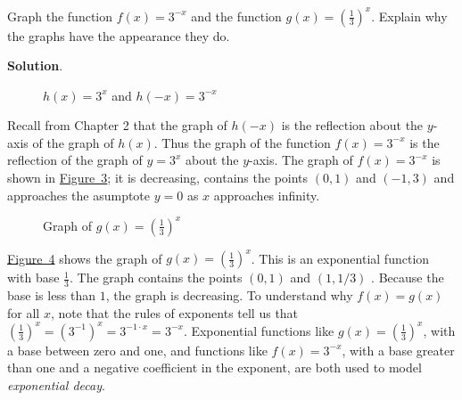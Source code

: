 \documentclass[10pt,]{book}
\theoremstyle{ptxdefinitionnotitle}
\theoremstyle{ptxdefinitiontitle}
\theoremstyle{ptxdefinitionnotitle}
\theoremstyle{ptxdefinitiontitle}
\theoremstyle{ptxdefinitionnotitle}
\theoremstyle{ptxdefinitiontitle}
\numberwithin{equation}{section}
\begin{document}
\begin{example}\label{example-14}
\hypertarget{p-235}{}%
Graph the function \(f(x)=3^{-x}\) and the function \(g(x)=(\frac{1}{3})^x\).  Explain why the graphs have the appearance they do.%
\par\smallskip%
\noindent\textbf{Solution}.\hypertarget{solution-14}{}\quad%
\hypertarget{p-236}{}%
\leavevmode%
\begin{figure}
\centering
{
}
\caption{\(h(x) = 3^x\) and \(h(-x) = 3^{-x}\)\label{figure-hreflection-of-3x}}
\end{figure}
 Recall from Chapter 2 that the graph of \(h(-x)\) is the reflection about the \(y\)-axis of the graph of \(h(x)\). Thus the graph of the function \(f(x)=3^{-x}\) is the reflection of the graph of \(y=3^x\) about the \(y\)-axis.  The graph of \(f(x)=3^{-x}\) is shown in \hyperref[figure-hreflection-of-3x]{Figure~3}; it is decreasing, contains the points \((0,1)\) and \((-1,3)\) and approaches the asumptote \(y=0\) as \(x\) approaches infinity. \begin{figure}
\centering
{
}
\caption{Graph of \(g(x)=(\frac{1}{3})^x\)\label{figure-graphofonethirdtothex}}
\end{figure}
 \hyperref[figure-graphofonethirdtothex]{Figure~4} shows the graph of \(g(x)=(\frac{1}{3})^x\). This is an exponential function with base \(\frac{1}{3}\).  The graph contains the points \((0,1)\)  and \((1,1/3)\) .  Because the base is less than \(1\), the graph is decreasing. To understand why \(f(x)=g(x)\) for all \(x\), note that the rules of exponents tell us that  \((\frac{1}{3})^x = ( 3^{-1} )^x = 3^{-1 \cdot x} = 3^{-x}\). Exponential functions like \(g(x)=(\frac{1}{3})^x\), with a base between zero and one, and functions like \(f(x)=3^{-x}\), with a base greater than one and a negative coefficient in the exponent, are both used to model \emph{exponential decay}.%
\end{example}
\end{document}
